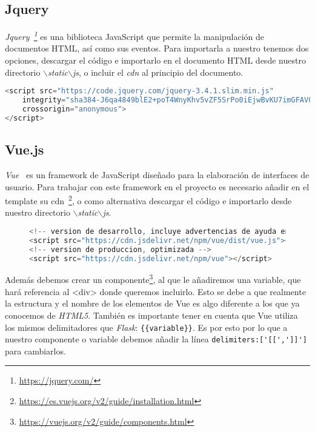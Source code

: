 \subsection{Jquery}\label{cap:jquery}
\textit{Jquery~\footnote{\url{https://jquery.com/}}} es una biblioteca JavaScript que permite la manipulación de documentos HTML, así como sus eventos. Para importarla a nuestro tenemos dos opciones, descargar el código e importarlo en el documento HTML desde nuestro directorio \textit{$\backslash$static$\backslash$js}, o incluir el \textit{cdn} al principio del documento.
\renewcommand{\lstlistingname}{Jquery}
\renewcommand{\lstlistlistingname}{List of \lstlistingname s}
\begin{lstlisting}[language=javascript,caption={Jquery cdn.}]
<script src="https://code.jquery.com/jquery-3.4.1.slim.min.js"
	integrity="sha384-J6qa4849blE2+poT4WnyKhv5vZF5SrPo0iEjwBvKU7imGFAV0wwj1yYfoRSJoZ+n"
	crossorigin="anonymous">
</script>
\end{lstlisting}

\subsection{Vue.js}\label{cap:Vue}
\textit{Vue}~\cite{doc:vue} es un framework de JavaScript diseñado para la elaboración de interfaces de usuario. Para trabajar con este framework en el proyecto es necesario añadir en el template su cdn~\footnote{\url{https://es.vuejs.org/v2/guide/installation.html}}, o como alternativa descargar el código e importarlo desde nuestro directorio \textit{$\backslash$static$\backslash$js}.
\renewcommand{\lstlistingname}{Vue.js}
\renewcommand{\lstlistlistingname}{List of \lstlistingname s}
\begin{figure}
\begin{lstlisting}[language=javascript,caption={Vue cdn.}]
<!-- version de desarrollo, incluye advertencias de ayuda en la consola -->
<script src="https://cdn.jsdelivr.net/npm/vue/dist/vue.js"></script>
<!-- version de produccion, optimizada -->
<script src="https://cdn.jsdelivr.net/npm/vue"></script>
\end{lstlisting}
\end{figure}

Además debemos crear un componente\footnote{\url{https://vuejs.org/v2/guide/components.html}}, al que le añadiremos una variable, que hará referencia al <div> donde queremos incluirlo. Esto se debe a que realmente la estructura y el nombre de los elementos de Vue es algo diferente a los que ya conocemos de \textit{HTML5}. También es importante tener en cuenta que Vue utiliza los mismos delimitadores que \textit{Flask}: \verb|{{variable}}|. Es por esto por lo que a nuestro componente o variable debemos añadir la línea \verb|delimiters:['[[',']]']| para cambiarlos.

